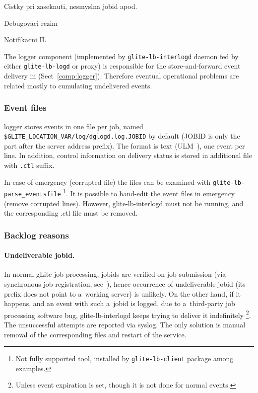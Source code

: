Cistky pri zaseknuti, nesmyslna jobid apod.

Debugovaci rezim

Notifikacni IL
\fi

The logger component (implemented by \verb'glite-lb-interlogd' daemon fed by
either \verb'glite-lb-logd' or \LB proxy)
is responsible for the store-and-forward event delivery in \LB
(Sect~\ref{comp:logger}).
Therefore eventual operational problems are related mostly to 
cumulating undelivered events.

\subsubsection{Event files}

\LB logger stores events in one file per job, named
\verb'$GLITE_LOCATION_VAR/log/dglogd.log.JOBID' by default
(JOBID is only the part after the \LB server address prefix).
The format is text (ULM~\cite{ulm}), one event per line.
In addition, control information on delivery status is stored in additional
file with \verb'.ctl' suffix.

\begin{sloppypar}
In case of emergency (\eg corrupted file) the files can be examined
with \verb'glite-lb-parse_eventsfile' %
\footnote{Not fully supported tool, installed by \texttt{glite-lb-client} package among examples.}.
It is possible to hand-edit the event files in emergency (remove corrupted lines).
However, glite-lb-interlogd must not be running, and the corresponding .ctl file
must be removed.
\end{sloppypar}

\subsubsection{Backlog reasons}

\paragraph{Undeliverable jobid.}
In normal gLite job processing, jobids are verified on job submission
(via synchronous job registration, see~\cite{lbug}), hence occurrence of
undeliverable jobid (\ie its prefix does not point to
a~working \LB server) is unlikely.
On the other hand, if it happens,
and an event with such a~jobid is logged,
\eg due to a~third-party job processing software bug,
glite-lb-interlogd keeps trying to deliver it indefinitely%
\footnote{Unless event expiration is set, though it is not done for normal events.}.
The unsuccessful attempts are reported via syslog.
The only solution is manual
removal of the corresponding files
and restart of the service.

